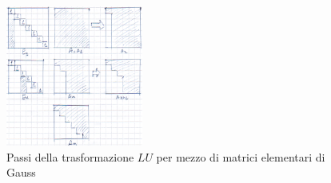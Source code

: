 \begin{figure}[h]
 \centering
 \includegraphics[width=0.40\textwidth]{./imgs/lu.png}
 \caption{Passi della trasformazione $LU$ per mezzo di matrici elementari di Gauss}
\end{figure}



